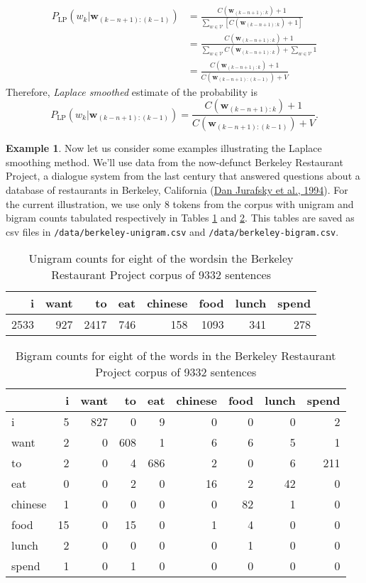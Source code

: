 \documentclass[
  12pt,
  a4paper]{article}
\theoremstyle{definition}
\theoremstyle{definition}
\newtheorem{example}{Example}[section]
\theoremstyle{definition}
\theoremstyle{definition}
\theoremstyle{remark}
\begin{document}
\[
\begin{aligned}
P_{\text{LP}}(w_k|\mathbf{w}_{(k-n+1):(k-1)})  
&= \frac{C(\mathbf{w}_{(k-n+1):k}) + 1}{\sum_{w\in\mathcal{V}}\left[ C(\mathbf{w}_{(k-n+1):k}) + 1 \right]} \\
&=  \frac{C(\mathbf{w}_{(k-n+1):k}) + 1}{\sum_{w\in\mathcal{V}} C(\mathbf{w}_{(k-n+1):k}) + \sum_{w\in\mathcal{V}}1 }  \\
&=  \frac{C(\mathbf{w}_{(k-n+1):k}) + 1}{C(\mathbf{w}_{(k-n+1):(k-1)}) + V }
\end{aligned}
\]
Therefore, \emph{Laplace smoothed} estimate of the probability is
\[
P_{\text{LP}}(w_k|\mathbf{w}_{(k-n+1):(k-1)}) = \frac{C(\mathbf{w}_{(k-n+1):k}) + 1}{C(\mathbf{w}_{(k-n+1):(k-1)}) + V }.
\]

\begin{example}
Now let us consider some examples illustrating the Laplace smoothing method.
We'll use data from the now-defunct Berkeley Restaurant Project,
a dialogue system from the last century that answered questions about a database
of restaurants in Berkeley, California (\protect\hyperlink{ref-Jurafsky1994TheBR}{Dan Jurafsky et al., 1994}). For the current illustration, we use only 8 tokens from the corpus with unigram and bigram counts tabulated respectively in Tables \ref{tab:berkeley-unigram} and \ref{tab:berkeley-bigram}. This tables are saved as csv files in \texttt{/data/berkeley-unigram.csv} and \texttt{/data/berkeley-bigram.csv}.

\begin{longtable}[t]{rrrrrrrr}
\caption{\label{tab:berkeley-unigram}Unigram counts for eight of the wordsin the Berkeley Restaurant Project corpus of 9332 sentences}\\
\toprule
i & want & to & eat & chinese & food & lunch & spend\\
\midrule
2533 & 927 & 2417 & 746 & 158 & 1093 & 341 & 278\\
\bottomrule
\end{longtable}

\begin{longtable}[t]{lrrrrrrrr}
\caption{\label{tab:berkeley-bigram}Bigram counts for eight of the words in the Berkeley Restaurant Project corpus of 9332 sentences}\\
\toprule
 & i & want & to & eat & chinese & food & lunch & spend\\
\midrule
i & 5 & 827 & 0 & 9 & 0 & 0 & 0 & 2\\
want & 2 & 0 & 608 & 1 & 6 & 6 & 5 & 1\\
to & 2 & 0 & 4 & 686 & 2 & 0 & 6 & 211\\
eat & 0 & 0 & 2 & 0 & 16 & 2 & 42 & 0\\
chinese & 1 & 0 & 0 & 0 & 0 & 82 & 1 & 0\\
\addlinespace
food & 15 & 0 & 15 & 0 & 1 & 4 & 0 & 0\\
lunch & 2 & 0 & 0 & 0 & 0 & 1 & 0 & 0\\
spend & 1 & 0 & 1 & 0 & 0 & 0 & 0 & 0\\
\bottomrule
\end{longtable}


\end{example}
\end{document}
